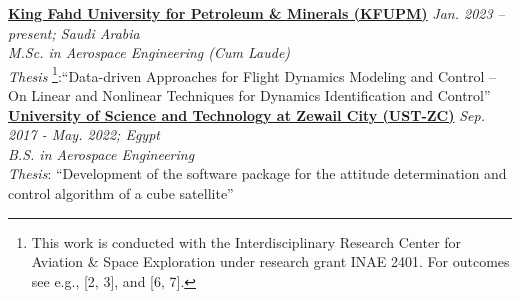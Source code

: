 \href{https://kfupm.edu.sa/}{\textbf{King Fahd University for Petroleum \& Minerals (KFUPM)}}
\hfill {\textit{Jan. 2023 – present; Saudi Arabia}}\\
\textit{M.Sc. in Aerospace Engineering (Cum Laude)}\\
\textit{Thesis}
\footnote{This work is conducted with the Interdisciplinary Research Center for Aviation \& Space Exploration under research grant INAE 2401. For outcomes see e.g., [2, 3], and [6, 7].}:``Data-driven Approaches for Flight Dynamics Modeling and Control -- On Linear and Nonlinear
Techniques for Dynamics Identification and Control''\\


\vspace{0.1 cm}
\href{https://zewailcity.edu.eg/}{\textbf{University of Science and Technology at Zewail City (UST-ZC)}}
\hfill {\textit{Sep. 2017 - May. 2022; Egypt}}\\
\textit{B.S. in Aerospace Engineering}\\
\textit{Thesis}: {``Development of the software package for the attitude determination and control
algorithm of a cube satellite''} \\
